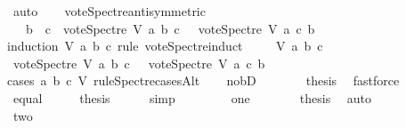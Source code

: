 \begin{isabellebody}
\ auto\isanewline
{}\isamarkupfalse%
%
\endisatagproof
{\isafoldproof}%
%
\isadelimproof
\isanewline
%
\endisadelimproof
\ \ \isanewline
\isanewline
\isanewline
{}\isamarkupfalse%
\ vote{\isacharunderscore}{\kern0pt}Spectre{\isacharunderscore}{\kern0pt}antisymmetric{\isacharcolon}{\kern0pt}\ \isanewline
\ \ \ {\isachardoublequoteopen}b\ {\isasymnoteq}\ c\ {\isasymLongrightarrow}\ vote{\isacharunderscore}{\kern0pt}Spectre\ V\ a\ b\ c\ {\isacharequal}{\kern0pt}\ {\isacharminus}{\kern0pt}\ {\isacharparenleft}{\kern0pt}vote{\isacharunderscore}{\kern0pt}Spectre\ V\ a\ c\ b{\isacharparenright}{\kern0pt}{\isachardoublequoteclose}\isanewline
%
\isadelimproof
%
\endisadelimproof
%
\isatagproof
{}\isamarkupfalse%
{\isacharparenleft}{\kern0pt}induction\ V\ a\ b\ c\ rule{\isacharcolon}{\kern0pt}\ vote{\isacharunderscore}{\kern0pt}Spectre{\isachardot}{\kern0pt}induct{\isacharparenright}{\kern0pt}\isanewline
\ \ \isamarkupfalse%
\ {\isacharparenleft}{\kern0pt}{}\ V\ a\ b\ c{\isacharparenright}{\kern0pt}\isanewline
\ \ \isamarkupfalse%
\ {\isachardoublequoteopen}vote{\isacharunderscore}{\kern0pt}Spectre\ V\ a\ b\ c\ {\isacharequal}{\kern0pt}\ {\isacharminus}{\kern0pt}\ vote{\isacharunderscore}{\kern0pt}Spectre\ V\ a\ c\ b{\isachardoublequoteclose}\isanewline
\ \ \isamarkupfalse%
{\isacharparenleft}{\kern0pt}cases\ a\ b\ c\ V\ rule{\isacharcolon}{\kern0pt}Spectre{\isacharunderscore}{\kern0pt}casesAlt{\isacharparenright}{\kern0pt}\isanewline
\ \ \isamarkupfalse%
\ no{\isacharunderscore}{\kern0pt}bD\isanewline
\ \ \ \ \isamarkupfalse%
\ \isamarkupfalse%
\ {\isacharquery}{\kern0pt}thesis\ \isamarkupfalse%
\ fastforce\isanewline
\ \ \isamarkupfalse%
\isanewline
\ \ \isamarkupfalse%
\ equal\isanewline
\ \ \isamarkupfalse%
\ \isamarkupfalse%
\ {\isacharquery}{\kern0pt}thesis\ \isamarkupfalse%
\ {}\ \ \isamarkupfalse%
\ simp\isanewline
\ \ \isamarkupfalse%
\isanewline
\ \ \ \ \isamarkupfalse%
\ one\isanewline
\ \ \ \ \isamarkupfalse%
\ \isamarkupfalse%
\ {\isacharquery}{\kern0pt}thesis\ \isamarkupfalse%
\ auto\ \ \ \isanewline
\ \ \isamarkupfalse%
\isanewline
\ \ \ \ \isamarkupfalse%
\ two\isanewline
\ \ \ \ \isamarkupfalse%
\ \isamarkupfalse%

\end{isabellebody}
